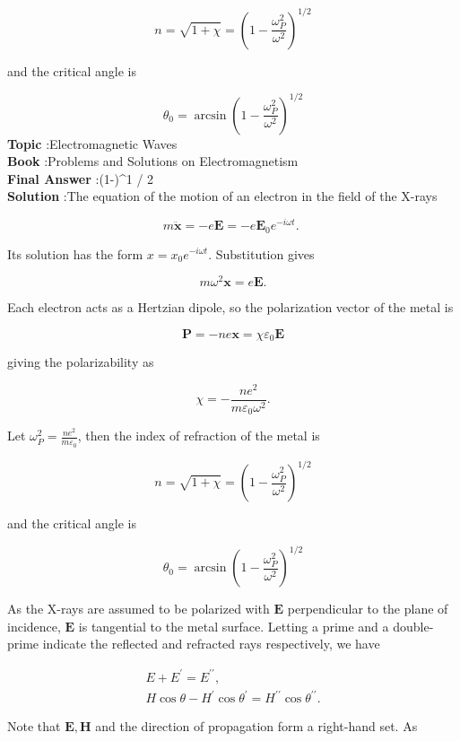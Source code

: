 \documentclass[10pt]{article}
\begin{document}
$$
n=\sqrt{1+\chi}=\left(1-\frac{\omega_{P}^{2}}{\omega^{2}}\right)^{1 / 2}
$$

and the critical angle is

$$
\theta_{0}=\arcsin \left(1-\frac{\omega_{P}^{2}}{\omega^{2}}\right)^{1 / 2}
$$
\textbf{Topic} :Electromagnetic Waves\\
\textbf{Book} :Problems and Solutions on Electromagnetism\\
\textbf{Final Answer} :\arcsin \left(1-\right)^{1 / 2}\\


\textbf{Solution} :The equation of the motion of an electron in the field of the X-rays

$$
m \ddot{\mathbf{x}}=-e \mathbf{E}=-e \mathbf{E}_{0} e^{-i \omega t} \text {. }
$$

Its solution has the form $x=x_{0} e^{-i \omega t}$. Substitution gives

$$
m \omega^{2} \mathbf{x}=e \mathbf{E} .
$$

Each electron acts as a Hertzian dipole, so the polarization vector of the metal is

$$
\mathbf{P}=-n e \mathbf{x}=\chi \varepsilon_{0} \mathbf{E}
$$

giving the polarizability as

$$
\chi=-\frac{n e^{2}}{m \varepsilon_{0} \omega^{2}} .
$$

Let $\omega_{P}^{2}=\frac{n e^{2}}{m \varepsilon_{0}}$, then the index of refraction of the metal is

$$
n=\sqrt{1+\chi}=\left(1-\frac{\omega_{P}^{2}}{\omega^{2}}\right)^{1 / 2}
$$

and the critical angle is

$$
\theta_{0}=\arcsin \left(1-\frac{\omega_{P}^{2}}{\omega^{2}}\right)^{1 / 2}
$$

 As the X-rays are assumed to be polarized with $\mathbf{E}$ perpendicular to the plane of incidence, $\mathbf{E}$ is tangential to the metal surface. Letting a prime and a double-prime indicate the reflected and refracted rays respectively, we have

$$
\begin{gathered}
E+E^{\prime}=E^{\prime \prime}, \\
H \cos \theta-H^{\prime} \cos \theta^{\prime}=H^{\prime \prime} \cos \theta^{\prime \prime} .
\end{gathered}
$$

Note that $\mathbf{E}, \mathbf{H}$ and the direction of propagation form a right-hand set. As
\end{document}

